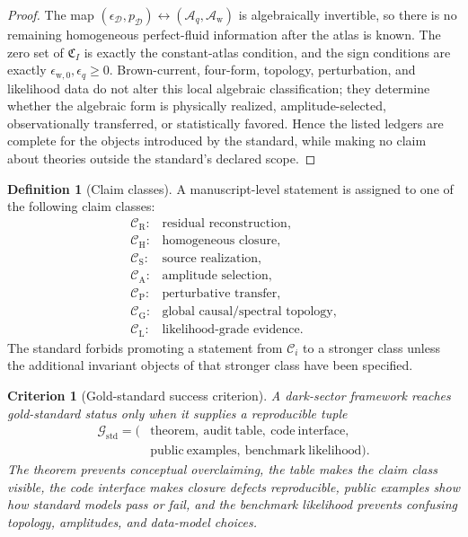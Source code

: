 \documentclass[
  aps,
  prd,
  reprint,
  superscriptaddress,
  floatfix,
  nofootinbib,
  longbibliography
]{revtex4-2}
\theoremstyle{plain}
\newtheorem{criterion}[theorem]{Criterion}
\theoremstyle{definition}
\newtheorem{definition}[theorem]{Definition}
\theoremstyle{remark}
\newcommand{\D}{\mathcal D}
\newcommand{\wind}{\mathrm w}
\newcommand{\Aq}{\mathcal A_q}
\newcommand{\Aw}{\mathcal A_{\mathrm w}}
\newcommand{\eps}{\epsilon}
\begin{document}
\begin{proof}
The map \((\eps_\D,p_\D)\leftrightarrow(\Aq,\Aw)\) is algebraically invertible,
so there is no remaining homogeneous perfect-fluid information after the atlas
is known.  The zero set of \(\mathfrak C_I\) is exactly the constant-atlas
condition, and the sign conditions are exactly \(\eps_{\wind,0},\eps_q\ge0\).
Brown-current, four-form, topology, perturbation, and likelihood data do not
alter this local algebraic classification; they determine whether the algebraic
form is physically realized, amplitude-selected, observationally transferred,
or statistically favored.  Hence the listed ledgers are complete for the objects
introduced by the standard, while making no claim about theories outside the
standard's declared scope.
\end{proof}

\begin{definition}[Claim classes]
A manuscript-level statement is assigned to one of the following claim classes:
\begin{equation}
\begin{array}{ll}
\mathcal C_{\mathrm R}: & \text{residual reconstruction},\\
\mathcal C_{\mathrm H}: & \text{homogeneous closure},\\
\mathcal C_{\mathrm S}: & \text{source realization},\\
\mathcal C_{\mathrm A}: & \text{amplitude selection},\\
\mathcal C_{\mathrm P}: & \text{perturbative transfer},\\
\mathcal C_{\mathrm G}: & \text{global causal/spectral topology},\\
\mathcal C_{\mathrm L}: & \text{likelihood-grade evidence}.
\end{array}
\label{eq:claim_classes_v28}
\end{equation}
The standard forbids promoting a statement from \(\mathcal C_i\) to a stronger
class unless the additional invariant objects of that stronger class have been
specified.
\end{definition}

\begin{criterion}[Gold-standard success criterion]
A dark-sector framework reaches gold-standard status only when it supplies a
reproducible tuple
\begin{equation}
\begin{aligned}
\mathcal G_{\mathrm{std}}=(
&\mathrm{theorem},\ \mathrm{audit\ table},\ \mathrm{code\ interface},\\
&\mathrm{public\ examples},\ \mathrm{benchmark\ likelihood}) .
\end{aligned}
\label{eq:gold_standard_tuple_v28}
\end{equation}
The theorem prevents conceptual overclaiming, the table makes the claim class
visible, the code interface makes closure defects reproducible, public examples
show how standard models pass or fail, and the benchmark likelihood prevents
confusing topology, amplitudes, and data-model choices.
\end{criterion}
\end{document}
